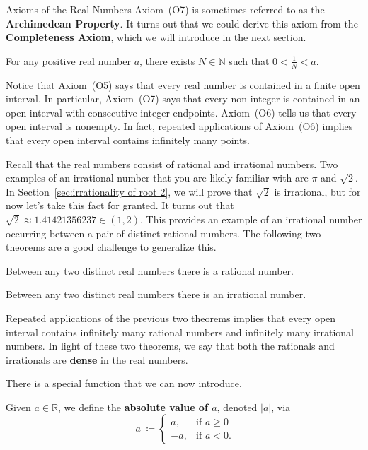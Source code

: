 \begin{section}{Axioms of the Real Numbers}
Axiom~(O7) is sometimes referred to as the \textbf{Archimedean Property}. It turns out that we could derive this axiom from the \textbf{Completeness Axiom}, which we will introduce in the next section.

\begin{theorem}
For any positive real number $a$, there exists $N\in \mathbb{N}$ such that $0<\frac{1}{N}<a$.
\end{theorem}

Notice that Axiom~(O5) says that every real number is contained in a finite open interval. In particular, Axiom~(O7) says that every non-integer is contained in an open interval with consecutive integer endpoints. Axiom~(O6) tells us that every open interval is nonempty. In fact, repeated applications of Axiom~(O6) implies that every open interval contains infinitely many points.

Recall that the real numbers consist of rational and irrational numbers.  Two examples of an irrational number that you are likely familiar with are $\pi$ and  $\sqrt{2}$. In Section~\ref{sec:irrationality of root 2}, we will prove that $\sqrt{2}$ is irrational, but for now let's take this fact for granted. It turns out that $\sqrt{2}\approx 1.41421356237\in (1,2)$. This provides an example of an irrational number occurring between a pair of distinct rational numbers. The following two theorems are a good challenge to generalize this.

\begin{theorem}\label{thm:rationals dense}
Between any two distinct real numbers there is a rational number.
\end{theorem}

\begin{theorem}\label{thm:irrationals dense}
Between any two distinct real numbers there is an irrational number.
\end{theorem}

Repeated applications of the previous two theorems implies that every open interval contains infinitely many rational numbers and infinitely many irrational numbers. In light of these two theorems, we say that both the rationals and irrationals are \textbf{dense} in the real numbers. 

There is a special function that we can now introduce. 

\begin{definition}
Given $a\in\mathbb{R}$, we define the \textbf{absolute value of $a$}, denoted $|a|$, via
\[
\boxed{|a|\coloneqq \begin{cases}
a, & \text{if }a\geq 0\\
-a, & \text{if }a<0.
\end{cases}}
\]
\end{definition}


\end{section}
